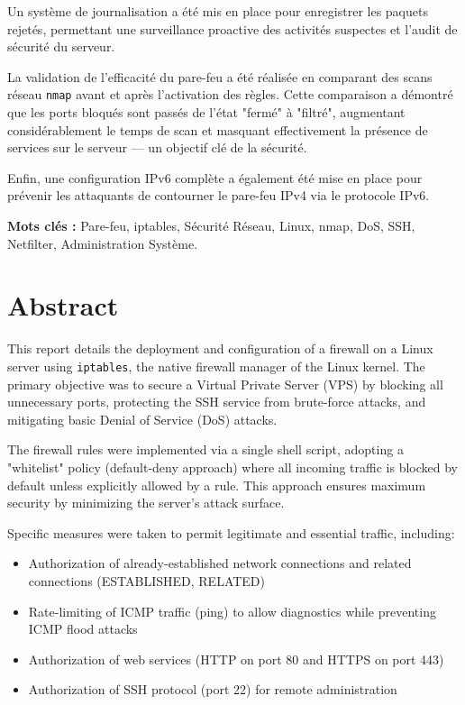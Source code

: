 Un système de journalisation a été mis en place pour enregistrer les paquets rejetés, permettant une surveillance proactive des activités suspectes et l'audit de sécurité du serveur.

La validation de l'efficacité du pare-feu a été réalisée en comparant des scans réseau \texttt{nmap} avant et après l'activation des règles. Cette comparaison a démontré que les ports bloqués sont passés de l'état "fermé" à "filtré", augmentant considérablement le temps de scan et masquant effectivement la présence de services sur le serveur — un objectif clé de la sécurité.

Enfin, une configuration IPv6 complète a également été mise en place pour prévenir les attaquants de contourner le pare-feu IPv4 via le protocole IPv6.

\vspace{1.5cm}
\noindent\textbf{Mots clés :} Pare-feu, iptables, Sécurité Réseau, Linux, nmap, DoS, SSH, Netfilter, Administration Système.

\chapter*{Abstract}

This report details the deployment and configuration of a firewall on a Linux server using \texttt{iptables}, the native firewall manager of the Linux kernel. The primary objective was to secure a Virtual Private Server (VPS) by blocking all unnecessary ports, protecting the SSH service from brute-force attacks, and mitigating basic Denial of Service (DoS) attacks.

The firewall rules were implemented via a single shell script, adopting a "whitelist" policy (default-deny approach) where all incoming traffic is blocked by default unless explicitly allowed by a rule. This approach ensures maximum security by minimizing the server's attack surface.

Specific measures were taken to permit legitimate and essential traffic, including:
\begin{itemize}
    \item Authorization of already-established network connections and related connections (ESTABLISHED, RELATED)
    \item Rate-limiting of ICMP traffic (ping) to allow diagnostics while preventing ICMP flood attacks
    \item Authorization of web services (HTTP on port 80 and HTTPS on port 443)
    \item Authorization of SSH protocol (port 22) for remote administration
\end{itemize}

